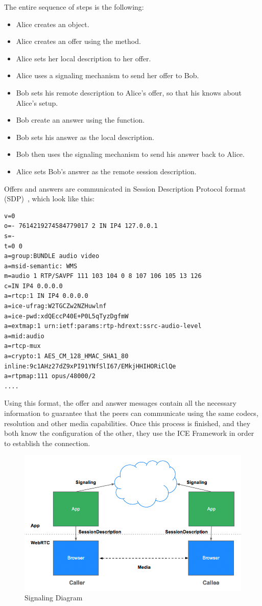The entire sequence of steps is the following:
\begin{itemize}
	\item Alice creates an \RTCPeerConnection object.
	\item Alice creates an offer using the \RTCPeerConnection \createOffer method.
	\item Alice sets her local description to her offer.
	\item Alice uses a signaling mechanism to send her offer to Bob.
	\item Bob sets his remote description to Alice's offer, so that his \RTCPeerConnection knows about Alice's setup.
	\item Bob create an answer using the \createAnswer function.
	\item Bob sets his answer as the local description.
	\item Bob then uses the signaling mechanism to send his answer back to Alice.
	\item Alice sets Bob's answer as the remote session description.
\end{itemize}
Offers and answers are communicated in Session Description Protocol format (SDP)~\cite{sdp}, which look like this:
\begin{verbatim}
v=0
o=- 7614219274584779017 2 IN IP4 127.0.0.1
s=-
t=0 0
a=group:BUNDLE audio video
a=msid-semantic: WMS
m=audio 1 RTP/SAVPF 111 103 104 0 8 107 106 105 13 126
c=IN IP4 0.0.0.0
a=rtcp:1 IN IP4 0.0.0.0
a=ice-ufrag:W2TGCZw2NZHuwlnf
a=ice-pwd:xdQEccP40E+P0L5qTyzDgfmW
a=extmap:1 urn:ietf:params:rtp-hdrext:ssrc-audio-level
a=mid:audio
a=rtcp-mux
a=crypto:1 AES_CM_128_HMAC_SHA1_80 inline:9c1AHz27dZ9xPI91YNfSlI67/EMkjHHIHORiClQe
a=rtpmap:111 opus/48000/2
....
\end{verbatim}
Using this format, the offer and answer messages contain all the necessary information to guarantee that the peers can communicate using the same codecs, resolution and other media capabilities. 
Once this process is finished, and they both know the configuration of the other, they use the ICE Framework in order to establish the connection.

\begin{figure}[ht]
  \centering
  \includegraphics[keepaspectratio=true, width=\textwidth]{images/jsep}\caption{Signaling Diagram}
  \label{fig:jsep}
\end{figure}

